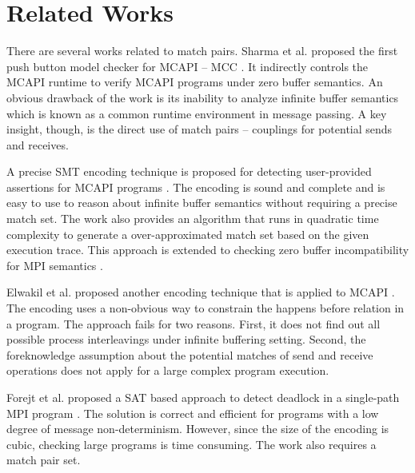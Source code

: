 \section{Related Works}
There are several works related to match pairs.
Sharma et al. proposed the first push button model checker for MCAPI -- MCC \cite{DBLP:conf/fmcad/SharmaGMH09}. It indirectly controls the MCAPI runtime to verify MCAPI programs under zero buffer semantics. An obvious drawback of the work is its inability to analyze infinite buffer semantics which is known as a common runtime environment in message passing. A key insight, though, is the direct use of match pairs -- couplings for potential sends and receives.

A precise SMT encoding technique is proposed for detecting user-provided assertions for MCAPI programs \cite{DBLP:conf/kbse/HuangMM13}. The encoding is sound and complete and is easy to use to reason about infinite buffer semantics without requiring a precise match set. The work also provides an algorithm that runs in quadratic time complexity to generate a over-approximated match set based on the given execution trace. This approach is extended to checking zero buffer incompatibility for MPI semantics \cite{HuangNFM15}. 

Elwakil et al. proposed another encoding technique that is applied to MCAPI \cite{DBLP:conf/atva/ElwakilYW10,DBLP:conf/issta/ElwakilY10}. The encoding uses a non-obvious way to constrain the happens before relation in a program. The approach fails for two reasons. First, it does not find out all possible process interleavings under infinite buffering setting. Second, the foreknowledge assumption about the potential matches of send and receive operations does not apply for a large complex program execution. 


Forejt et al. proposed a SAT based approach to detect deadlock in a single-path MPI program \cite{DBLP:conf/fm/ForejtKNS14}. The solution is correct and efficient for programs with a low degree of message non-determinism. However, since the size of the encoding is cubic, checking large programs is time consuming. The work also requires a match pair set.


